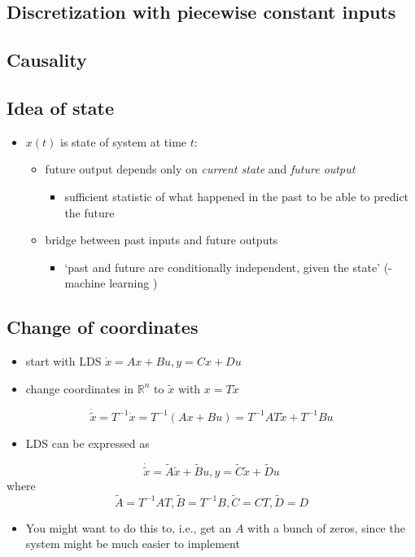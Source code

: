 \documentclass[10pt,letterpaper]{article}
\begin{document}
\subsection{Discretization with piecewise constant inputs}
\label{sec-13_2}
\subsection{Causality}
\label{sec-13_3}
\subsection{Idea of state}
\label{sec-13_4}

\begin{itemize}
\item $x(t)$ is state of system at time $t$:

\begin{itemize}
\item future output depends only on \emph{current state} and \emph{future output}

\begin{itemize}
\item sufficient statistic of what happened in the past to be able to predict the future
\end{itemize}

\item bridge between past inputs and future outputs

\begin{itemize}
\item `past and future are conditionally independent, given the state' (-machine learning )
\end{itemize}

\end{itemize}

\end{itemize}
\subsection{Change of coordinates}
\label{sec-13_5}

\begin{itemize}
\item start with LDS $\dot x=Ax+Bu,y=Cx+Du$
\item change coordinates in $\mathbb{R}^{n}$ to $\tilde x$ with $x=T \tilde x$
\end{itemize}
$$ 
\dot{\tilde x} = T ^{-1} \dot x = T ^{-1} (Ax+Bu) = T ^{-1} AT \tilde x + T ^{-1} Bu
$$
\begin{itemize}
\item LDS can be expressed as
\end{itemize}
$$
\dot{\tilde x} = \tilde A \tilde x+\tilde B u, y= \tilde C \tilde x + \tilde D u
$$
where
$$ 
\tilde A = T ^{-1} A T, \tilde B= T ^{-1} B, \tilde C = CT, \tilde D=D
$$ 
\begin{itemize}
\item You might want to do this to, i.e., get an $A$ with a bunch of zeros, since the system might be much easier to implement
\end{itemize}
\end{document}
